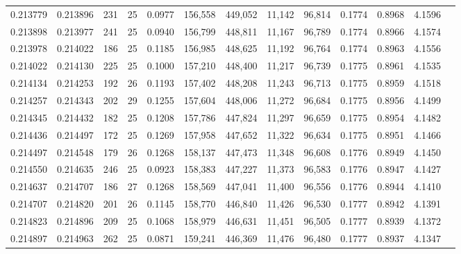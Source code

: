 \begin{tabular}{rrrrrrrrrrrrr}
0.213779 & 0.213896 &   231 &  25 &                                     0.0977 & 156,558 & 449,052 &  11,142 &  96,814 & 0.1774 & 0.8968 & 4.1596 \\
0.213898 & 0.213977 &   241 &  25 &                                     0.0940 & 156,799 & 448,811 &  11,167 &  96,789 & 0.1774 & 0.8966 & 4.1574 \\
0.213978 & 0.214022 &   186 &  25 &                                     0.1185 & 156,985 & 448,625 &  11,192 &  96,764 & 0.1774 & 0.8963 & 4.1556 \\
0.214022 & 0.214130 &   225 &  25 &                                     0.1000 & 157,210 & 448,400 &  11,217 &  96,739 & 0.1775 & 0.8961 & 4.1535 \\
0.214134 & 0.214253 &   192 &  26 &                                     0.1193 & 157,402 & 448,208 &  11,243 &  96,713 & 0.1775 & 0.8959 & 4.1518 \\
0.214257 & 0.214343 &   202 &  29 &                                     0.1255 & 157,604 & 448,006 &  11,272 &  96,684 & 0.1775 & 0.8956 & 4.1499 \\
0.214345 & 0.214432 &   182 &  25 &                                     0.1208 & 157,786 & 447,824 &  11,297 &  96,659 & 0.1775 & 0.8954 & 4.1482 \\
0.214436 & 0.214497 &   172 &  25 &                                     0.1269 & 157,958 & 447,652 &  11,322 &  96,634 & 0.1775 & 0.8951 & 4.1466 \\
0.214497 & 0.214548 &   179 &  26 &                                     0.1268 & 158,137 & 447,473 &  11,348 &  96,608 & 0.1776 & 0.8949 & 4.1450 \\
0.214550 & 0.214635 &   246 &  25 &                                     0.0923 & 158,383 & 447,227 &  11,373 &  96,583 & 0.1776 & 0.8947 & 4.1427 \\
0.214637 & 0.214707 &   186 &  27 &                                     0.1268 & 158,569 & 447,041 &  11,400 &  96,556 & 0.1776 & 0.8944 & 4.1410 \\
0.214707 & 0.214820 &   201 &  26 &                                     0.1145 & 158,770 & 446,840 &  11,426 &  96,530 & 0.1777 & 0.8942 & 4.1391 \\
0.214823 & 0.214896 &   209 &  25 &                                     0.1068 & 158,979 & 446,631 &  11,451 &  96,505 & 0.1777 & 0.8939 & 4.1372 \\
0.214897 & 0.214963 &   262 &  25 &                                     0.0871 & 159,241 & 446,369 &  11,476 &  96,480 & 0.1777 & 0.8937 & 4.1347 \\

\end{tabular}
